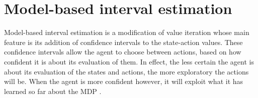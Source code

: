\section{Model-based interval estimation}
\label{sec:mbie}

Model-based interval estimation is a modification of value iteration whose main feature is its  addition of confidence
intervals to the state-action values. These confidence intervals allow the agent to choose between
actions, based on how confident it is about its evaluation of them. In effect,
the less certain the agent is about its evaluation of the states and actions,
the more exploratory the actions will be. When the agent is more confident
however, it will exploit what it has learned so far about the MDP
\parencite{dietterich2013pac}.



